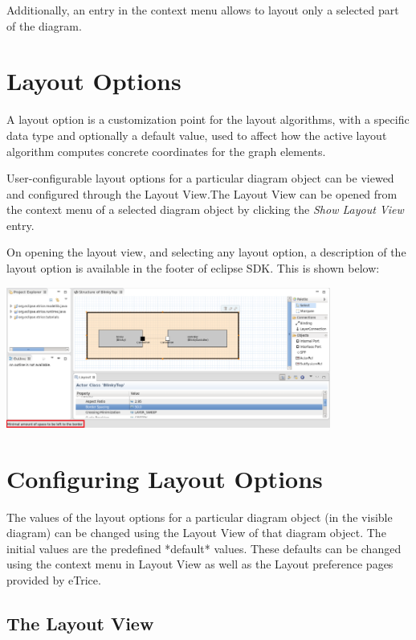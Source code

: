 Additionally, an entry in the context menu allows to layout only a selected part of the diagram.

\section{\label{layoutOptions}Layout Options}

A layout option is a customization point for the layout algorithms, with a specific data type and optionally a default value, used to affect how the active layout algorithm computes concrete coordinates for the graph elements.

User-configurable layout options for a particular diagram object can be viewed and configured through the Layout View.The Layout View can be opened from the context menu of a selected diagram object by clicking the \textit{Show Layout View} entry. 

On opening the layout view, and selecting any layout option, a description of the layout option is available in the footer of eclipse SDK. This is shown below:

\includegraphics[width=0.8\textwidth]{images/043-LayoutOptionDescription.png}

\section{\label{configureOptions}Configuring Layout Options}

The values of the layout options for a particular diagram object (in the visible diagram) can be changed using the Layout View of that diagram object. The initial values are the predefined *default* values. These defaults can be changed using the context menu in Layout View as well as the Layout preference pages provided by eTrice.

\subsection{\label{layoutView}The Layout View}

